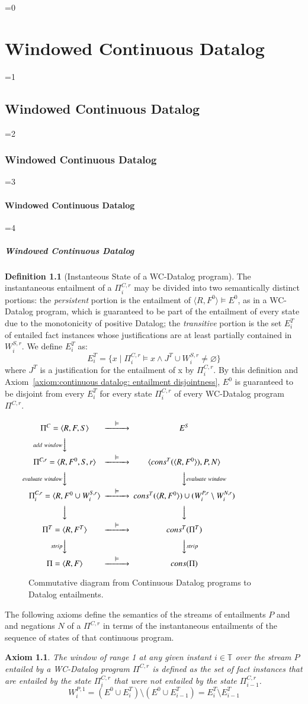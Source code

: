 \documentclass[twocolumn,preprint,3p,number]{elsarticle}
\theoremstyle{plain}
\newtheorem{axiom}{Axiom}
\theoremstyle{definition}
\newtheorem{definition}{Definition}
\newcounter{nestingdepth}
\newenvironment{nestedsection}[2]{
  \ifnum\value{nestingdepth}=0
    \chapter{#1}
  \else
    \ifnum\value{nestingdepth}=1
      \section{#1}
    \else
      \ifnum\value{nestingdepth}=2
        \subsection{#1}
      \else
        \ifnum\value{nestingdepth}=3
          \subsubsection{#1}
        \else
          \ifnum\value{nestingdepth}=4
            \paragraph{#1}
          \else
            \PackageError{nestedsections}{Maximum nesting level exceeded!}{uh oh!}
          \fi
        \fi
      \fi
    \fi
  \fi
  \addtocounter{nestingdepth}{1}
  \label{sec:#2}
}{\addtocounter{nestingdepth}{-1}}
\def\labelfig#1{\label{fig:#1}}
\begin{document}
\begin{nestedsection}{Windowed Continuous Datalog}{semantics}
\begin{definition}[Instanteous State of a WC-Datalog program]
The instantaneous entailment of a $\Pi^{C,r}_i$ may be divided into two
semantically distinct portions: the \emph{persistent} portion is the
entailment of ${\langle R, F^0 \rangle \models E^0}$, as in a WC-Datalog
program, which is guaranteed to be part of the entailment of every state
due to the monotonicity of positive Datalog; the \emph{transitive} portion
is the set $E^T_{i}$ of entailed fact instances whose justifications are at
least partially contained in $W^{S,r}_i$. {\nobreak We define $E^T_i$ as:
\[
E^T_i = \{ x \mid \Pi^{C,r}_i \models x \land J^T \cup W^{S,r}_i \neq \varnothing \}
\]
where $J^T$ is a justification for the entailment of x by
$\Pi^{C,r}_i$.} By this definition and Axiom~\ref{axiom:continuous
  datalog: entailment disjointness}, $E^0$ is guaranteed to be
disjoint from every $E^T_i$ for every state $\Pi^{C,r}_i$ of every
WC-Datalog program $\Pi^{C,r}$.
\end{definition}

\begin{figure}
\centering
$
\begin{CD}
  {\Pi^C = \langle R, F, S \rangle} @>\models>> {E^S} \\
  @V{add\ window}VV \\
        {\Pi^{C,r} = \langle R, F^0, S, r \rangle} @>\models>> {\langle cons^T(\langle R, F^0\rangle), P, N \rangle} \\
        @V{evaluate\ window}VV @VV{evaluate\ window}V \\
        {\Pi^{C,r}_i = \langle R, F^0 \cup W^{S,r}_i \rangle} @>\models>> {cons^T(\langle R, F^0 \rangle) \cup (W^{P,r}_i \setminus W^{N,r}_i)} \\
  @VVV @VVV \\
        {\Pi^T = \langle R, F^T \rangle } @>\models>> {cons^T(\Pi^T)} \\
  @V{strip}VV @VV{strip}V \\
        {\Pi = \langle R, F \rangle } @>\models>> {cons(\Pi)}
\end{CD}
$
\caption{Commutative diagram from Continuous Datalog programs to Datalog entailments.}
\labelfig{CD-TD-D}
\end{figure}

The following axioms define the semantics of the streams of
entailments $P$ and and negations $N$ of a $\Pi^{C,r}$ in terms of the
instantaneous entailments of the sequence of states of that continuous
program.

{\nobreak\begin{axiom}
\label{axiom:continuous datalog: positive window increment}
The window of range 1 at any given instant ${i \in \mathbb{T}}$ over
the stream $P$ entailed by a WC-Datalog program $\Pi^{C,r}$ is defined
as the set of fact instances that are entailed by the state
$\Pi^{C,r}_i$ that were not entailed by the state $\Pi^{C,r}_{i-1}$.
\begin{equation*}
W^{P,1}_{i} = \left( E^0 \cup E^T_{i} \right) \setminus
\left( E^0 \cup E^T_{i-1} \right) = E^T_{i} \setminus E^T_{i-1}
\end{equation*}
\end{axiom}}


\end{nestedsection}
\end{document}
